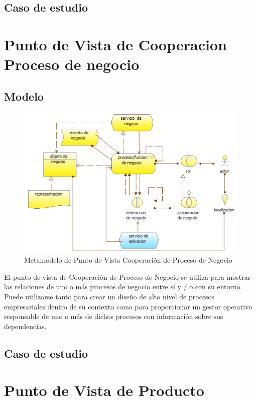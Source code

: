 \subsection{Caso de estudio}




\newpage

\section{Punto de Vista de Cooperacion Proceso de negocio}

\subsection{Modelo}
\begin{figure}[th!]
	\centering
	\includegraphics[width=0.6\linewidth]{arquitectura/imagenes/modeloCooperacionProcesoNegocio}
	\caption{Metamodelo de Punto de Vista Cooperación de Proceso de Negocio \cite{pun5}}
	\label{fig:metamodelo de punto de vista de cooperacion proceso de negocio}
\end{figure}
El punto de vista de Cooperación de Proceso de Negocio se utiliza para mostrar las relaciones de uno o más procesos de negocio entre sí y / o con su entorno. Puede utilizarse tanto para crear un diseño de alto nivel de procesos empresariales dentro de su contexto como para proporcionar un gestor operativo responsable de uno o más de dichos procesos con información sobre sus dependencias.
\newpage

\subsection{Caso de estudio}

\newpage

\section{Punto de Vista de Producto}


